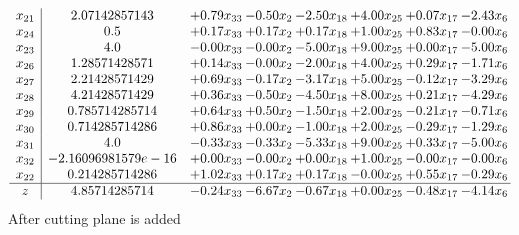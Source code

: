 \documentclass[8pt]{article}
\begin{document}
\[\begin{array}{c| c c@{\hskip 2pt} c@{\hskip 2pt} c@{\hskip 2pt} c@{\hskip 2pt} c@{\hskip 2pt} c@{\hskip 2pt} }
 x_{21}   &  2.07142857143 & +  0.79 x_{33} & -0.50 x_{2} & -2.50 x_{18} & +  4.00 x_{25} & +  0.07 x_{17} & -2.43 x_{6}\\
 x_{24}   &  0.5 & +  0.17 x_{33} & +  0.17 x_{2} & +  0.17 x_{18} & +  1.00 x_{25} & +  0.83 x_{17} & -0.00 x_{6}\\
 x_{23}   &  4.0 & -0.00 x_{33} & -0.00 x_{2} & -5.00 x_{18} & +  9.00 x_{25} & +  0.00 x_{17} & -5.00 x_{6}\\
 x_{26}   &  1.28571428571 & +  0.14 x_{33} & -0.00 x_{2} & -2.00 x_{18} & +  4.00 x_{25} & +  0.29 x_{17} & -1.71 x_{6}\\
 x_{27}   &  2.21428571429 & +  0.69 x_{33} & -0.17 x_{2} & -3.17 x_{18} & +  5.00 x_{25} & -0.12 x_{17} & -3.29 x_{6}\\
 x_{28}   &  4.21428571429 & +  0.36 x_{33} & -0.50 x_{2} & -4.50 x_{18} & +  8.00 x_{25} & +  0.21 x_{17} & -4.29 x_{6}\\
 x_{29}   &  0.785714285714 & +  0.64 x_{33} & +  0.50 x_{2} & -1.50 x_{18} & +  2.00 x_{25} & -0.21 x_{17} & -0.71 x_{6}\\
 x_{30}   &  0.714285714286 & +  0.86 x_{33} & +  0.00 x_{2} & -1.00 x_{18} & +  2.00 x_{25} & -0.29 x_{17} & -1.29 x_{6}\\
 x_{31}   &  4.0 & -0.33 x_{33} & -0.33 x_{2} & -5.33 x_{18} & +  9.00 x_{25} & +  0.33 x_{17} & -5.00 x_{6}\\
 x_{32}   &  -2.16096981579e-16 & +  0.00 x_{33} & -0.00 x_{2} & +  0.00 x_{18} & +  1.00 x_{25} & -0.00 x_{17} & -0.00 x_{6}\\
 x_{22}   &  0.214285714286 & +  1.02 x_{33} & +  0.17 x_{2} & +  0.17 x_{18} & -0.00 x_{25} & +  0.55 x_{17} & -0.29 x_{6}\\
\hline
z    &  4.85714285714 & -0.24 x_{33} & -6.67 x_{2} & -0.67 x_{18} & +  0.00 x_{25} & -0.48 x_{17} & -4.14 x_{6}\\
\end{array}\]
 After cutting plane is added 
\end{document}
